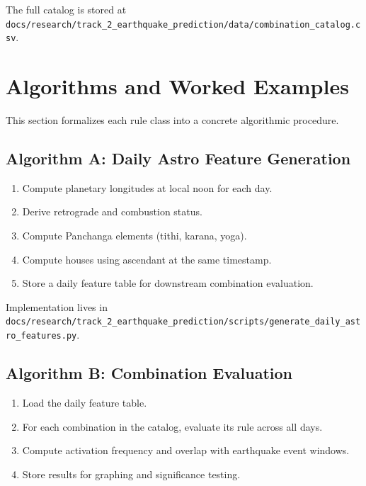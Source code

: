 \documentclass[
  11pt,
  a4paper,
  oneside,
  openany]{article}
\providecommand{\tightlist}{%
  \setlength{\itemsep}{0pt}\setlength{\parskip}{0pt}}\usepackage{longtable,booktabs,array}
\begin{document}
The full catalog is stored at
\texttt{docs/research/track\_2\_earthquake\_prediction/data/combination\_catalog.csv}.

\section{Algorithms and Worked
Examples}\label{algorithms-and-worked-examples}

This section formalizes each rule class into a concrete algorithmic
procedure.

\subsection{Algorithm A: Daily Astro Feature
Generation}\label{algorithm-a-daily-astro-feature-generation}

\begin{enumerate}
\def\labelenumi{\arabic{enumi}.}
\tightlist
\item
  Compute planetary longitudes at local noon for each day.
\item
  Derive retrograde and combustion status.
\item
  Compute Panchanga elements (tithi, karana, yoga).
\item
  Compute houses using ascendant at the same timestamp.
\item
  Store a daily feature table for downstream combination evaluation.
\end{enumerate}

Implementation lives in
\texttt{docs/research/track\_2\_earthquake\_prediction/scripts/generate\_daily\_astro\_features.py}.

\subsection{Algorithm B: Combination
Evaluation}\label{algorithm-b-combination-evaluation}

\begin{enumerate}
\def\labelenumi{\arabic{enumi}.}
\tightlist
\item
  Load the daily feature table.
\item
  For each combination in the catalog, evaluate its rule across all
  days.
\item
  Compute activation frequency and overlap with earthquake event
  windows.
\item
  Store results for graphing and significance testing.
\end{enumerate}
\end{document}
